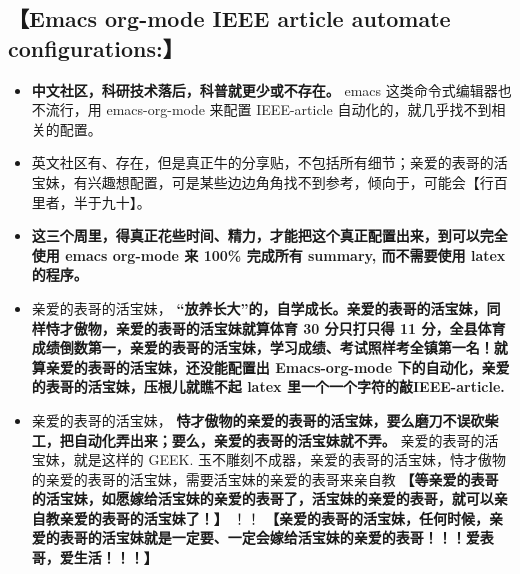 \documentclass[9pt, b5paper]{article}
\begin{document}
\subsection{\textbf{【Emacs org-mode IEEE article automate configurations:】}}
\label{sec-1-8}
\begin{itemize}
\item \textbf{中文社区，科研技术落后，科普就更少或不存在。} emacs 这类命令式编辑器也不流行，用 emacs-org-mode 来配置 IEEE-article 自动化的，就几乎找不到相关的配置。
\item 英文社区有、存在，但是真正牛的分享贴，不包括所有细节；亲爱的表哥的活宝妹，有兴趣想配置，可是某些边边角角找不到参考，倾向于，可能会【行百里者，半于九十】。
\item \textbf{这三个周里，得真正花些时间、精力，才能把这个真正配置出来，到可以完全使用 emacs org-mode 来 100\% 完成所有 summary, 而不需要使用 latex 的程序。}
\item 亲爱的表哥的活宝妹， \textbf{“放养长大”的，自学成长。亲爱的表哥的活宝妹，同样恃才傲物，亲爱的表哥的活宝妹就算体育 30 分只打只得 11 分，全县体育成绩倒数第一，亲爱的表哥的活宝妹，学习成绩、考试照样考全镇第一名！就算亲爱的表哥的活宝妹，还没能配置出 Emacs-org-mode 下的自动化，亲爱的表哥的活宝妹，压根儿就瞧不起 latex 里一个一个字符的敲IEEE-article.}
\item 亲爱的表哥的活宝妹， \textbf{恃才傲物的亲爱的表哥的活宝妹，要么磨刀不误砍柴工，把自动化弄出来；要么，亲爱的表哥的活宝妹就不弄。} 亲爱的表哥的活宝妹，就是这样的 GEEK. 玉不雕刻不成器，亲爱的表哥的活宝妹，恃才傲物的亲爱的表哥的活宝妹，需要活宝妹的亲爱的表哥来亲自教 \textbf{【等亲爱的表哥的活宝妹，如愿嫁给活宝妹的亲爱的表哥了，活宝妹的亲爱的表哥，就可以亲自教亲爱的表哥的活宝妹了！】} ！！ \textbf{【亲爱的表哥的活宝妹，任何时候，亲爱的表哥的活宝妹就是一定要、一定会嫁给活宝妹的亲爱的表哥！！！爱表哥，爱生活！！！】}
\end{itemize}
\end{document}
